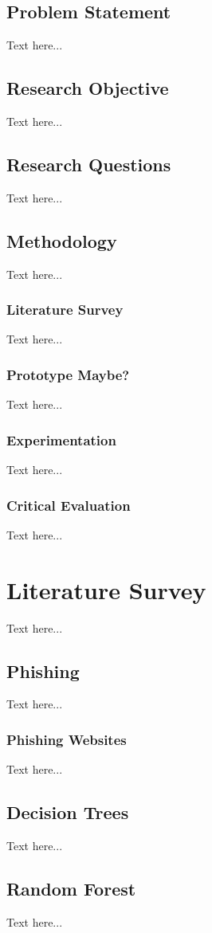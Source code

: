 \documentclass{sigkddExp}
\begin{document}
\subsection{Problem Statement}
Text here...
\subsection{Research Objective}
Text here...
\subsection{Research Questions}
Text here...
\subsection{Methodology}
Text here...

\subsubsection{Literature Survey}
Text here...
\subsubsection{Prototype Maybe?}
Text here...
\subsubsection{Experimentation}
Text here...
\subsubsection{Critical Evaluation}
Text here...

\section{Literature Survey}
Text here...
\subsection{Phishing}
Text here...
\subsubsection{Phishing Websites}
Text here...
\subsection{Decision Trees}
Text here...
\subsection{Random Forest}
Text here...
\end{document}
